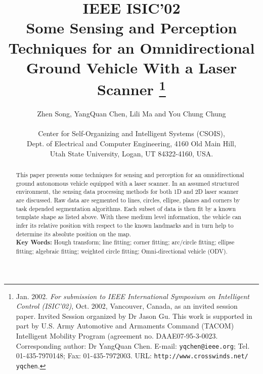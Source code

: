 \documentclass{cdcarta4}
\begin{document}
  

\title{{\vspace*{-1cm} \hspace*{12.5cm} \Large \bf IEEE ISIC'02}
\\
 \Large \bf  
Some Sensing and Perception Techniques for  an Omnidirectional Ground Vehicle
With a Laser Scanner
\thanks{Jan. 2002.  {\em For submission to IEEE International Symposium on Intelligent Control (ISIC'02)},  Oct. 2002, Vancouver, Canada, as an invited session paper.   Invited Session   organized by Dr  Jason Gu.
This work is supported in part by U.S. Army Automotive and Armaments Command (TACOM)
 Intelligent Mobility Program (agreement no. DAAE07-95-3-0023. Corresponding author: Dr YangQuan Chen. E-mail:  \texttt{yqchen@ieee.org}; Tel. 01-435-7970148; Fax: 01-435-7972003. URL: \texttt{http://www.crosswinds.net/ yqchen}. 
} 
}


\author{
Zhen Song,   YangQuan Chen,  Lili Ma and   You Chung Chung\\ \\
 Center for Self-Organizing and Intelligent Systems (CSOIS),  \\
Dept. of Electrical and Computer Engineering,  4160 Old Main Hill, \\
Utah State University, Logan, UT 84322-4160, USA. \\
}
     
    
\maketitle

\begin{abstract}                          %
This paper presents some techniques for sensing and perception for an
omnidirectional ground autonomous vehicle equipped with a laser scanner. In an
assumed structured environment, the sensing data processing methods for both 1D
and 2D laser scanner are discussed. Raw data are segmented to lines, circles,
ellipse, planes and corners by task depended segmentation algorithms.  Each
subset of data is then fit by a known template shape as listed above.  With
these medium level information, the vehicle can infer its relative position with
respect to the known landmarks and in turn help to determine its absolute
position on the map.
\\
{\bf Key Words: } 
 Hough transform;
 line fitting;
 corner fitting;
 arc/circle fitting;
 ellipse fitting;
 algebraic fitting;
 weighted circle fitting;
 Omni-directional vehicle (ODV).
\end{abstract}
\end{document}
